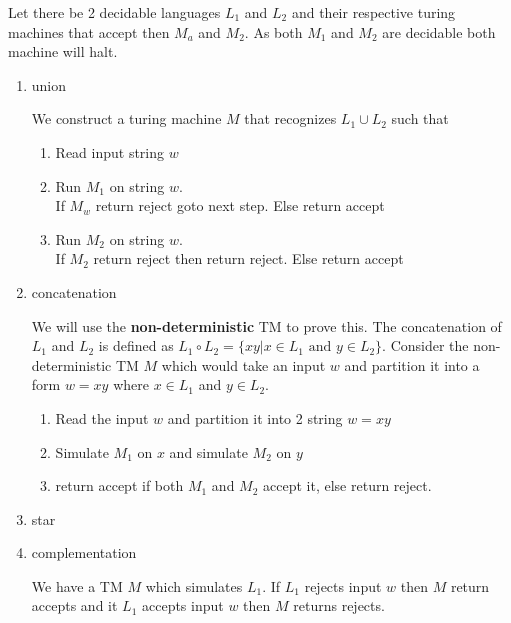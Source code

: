 \documentclass[12pt]{exam}
\begin{document}
\begin{questions}
  \begin{solution}
    Let there be 2 decidable languages $L_{1}$ and $L_{2}$ and their respective turing machines that accept then $M_{a}$ and $M_{2}$.
    As both $M_{1}$ and $M_{2}$ are decidable both machine will halt.

    \begin{enumerate}
      \item union

            We construct a turing machine $M$ that recognizes $L_{1}\cup L_{2}$ such that

            \begin{enumerate}[i]
            \item Read input string $w$
            \item  Run $M_{1}$ on string $w$.\\
                    \null \quad If $M_{w}$ return reject goto next step. Else return accept
            \item Run $M_{2}$ on string $w$.\\
                    \null \quad If $M_{2}$ return reject then return reject. Else return accept

            \end{enumerate}


      \item concatenation

            We will use the \textbf{non-deterministic} TM to prove this. The concatenation of $L_{1}$ and $ L_{2}$ is defined as $L_{1}\circ L_{2} = \{xy| x\in L_{1} \text{ and } y\in L_{2}\}$.
            Consider the non-deterministic TM $M$ which would take an input $w$ and partition it into a form $w = xy$ where $x \in L_{1}$ and $y\in L_{2}$.

            \begin{enumerate}[i]
              \item Read the input $w$ and partition it into 2 string $w = xy$
              \item Simulate $M_{1}$ on $x$ and simulate $M_{2}$ on $y$
              \item return accept if both $M_{1}$ and $M_{2}$ accept it, else return reject.
            \end{enumerate}

      \item star

      \item complementation

            We have a TM $M$ which simulates $L_{1}$. If $L_{1}$ rejects input $w$ then $M$ return accepts and it $L_{1}$ accepts input $w$ then $M$ returns rejects.


\end{enumerate}
\end{solution}
\end{questions}
\end{document}
